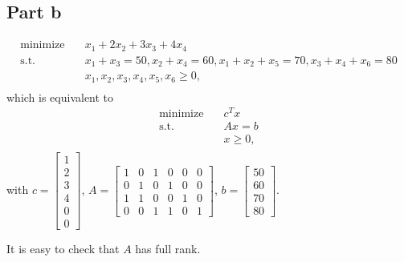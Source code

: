 \documentclass{article}
\begin{document}
\subsection*{Part b}
\[
\begin{aligned}
\text{minimize}\quad & x_1+2x_2+3x_3+4x_4\\
\textrm{s.t.} \quad &x_1+x_3=50,x_2+x_4=60,x_1+x_2+x_5=70,x_3+x_4+x_6=80\\
  &x_1,x_2,x_3,x_4,x_5,x_6\geq0,\\
\end{aligned}
\]
which is equivalent to
\[
\begin{aligned}
\text{minimize}\quad & c^Tx\\
\textrm{s.t.} \quad &Ax=b\\
  &x\geq0,\\
\end{aligned}
\]
with $c=\begin{bmatrix}
1\\2\\3\\4\\0\\0
\end{bmatrix}$, $A=\begin{bmatrix}
1 & 0 & 1 & 0 & 0 & 0\\
0 & 1 & 0 & 1 & 0 & 0\\
1 & 1 & 0 & 0 & 1 & 0\\
0 & 0 & 1 & 1 & 0 & 1
\end{bmatrix}$, $b=\begin{bmatrix}
50\\60\\70\\80
\end{bmatrix}$.

It is easy to check that $A$ has full rank.
\end{document}
